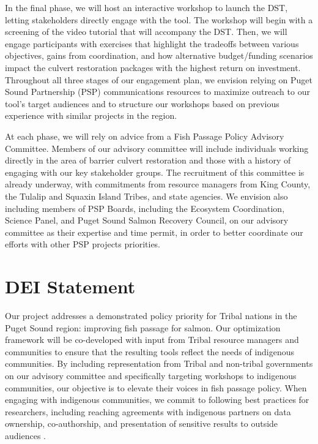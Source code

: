 \documentclass[12pt]{elsarticle}
\begin{document}
	In the final phase, we will host an interactive workshop to launch the DST, letting stakeholders directly engage with the tool. The workshop will begin with a screening of the video tutorial that will accompany the DST. Then, we will engage participants with exercises that highlight the tradeoffs between various objectives, gains from coordination, and how alternative budget/funding scenarios impact the culvert restoration packages with the highest return on investment. Throughout all three stages of our engagement plan, we envision relying on Puget Sound Partnership (PSP) communications resources to maximize outreach to our tool's target audiences and to structure our workshops based on previous experience with similar projects in the region. 
	
	At each phase, we will rely on advice from a Fish Passage Policy Advisory Committee. Members of our advisory committee will include individuals working directly in the area of barrier culvert restoration and those with a history of engaging with our key stakeholder groups. The recruitment of this committee is already underway, with commitments from resource managers from King County, the Tulalip and Squaxin Island Tribes, and state agencies. We envision also including members of PSP Boards, including the Ecosystem Coordination, Science Panel, and Puget Sound Salmon Recovery Council, on our advisory committee as their expertise and time permit, in order to better coordinate our efforts with other PSP projects priorities. 
	
	\section{DEI Statement}
	Our project addresses a demonstrated policy priority for Tribal nations in the Puget Sound region: improving fish passage for salmon. Our optimization framework will be co-developed with input from Tribal resource managers and communities to ensure that the resulting tools reflect the needs of indigenous communities. By including representation from Tribal and non-tribal governments on our advisory committee and specifically targeting workshops to indigenous communities, our objective is to elevate their voices in fish passage policy. When engaging with indigenous communities, we commit to following best practices for researchers, including reaching agreements with indigenous partners on data ownership, co-authorship, and presentation of sensitive results to outside audiences \cite{ban_incorporate_2018}.
	
\end{document}
